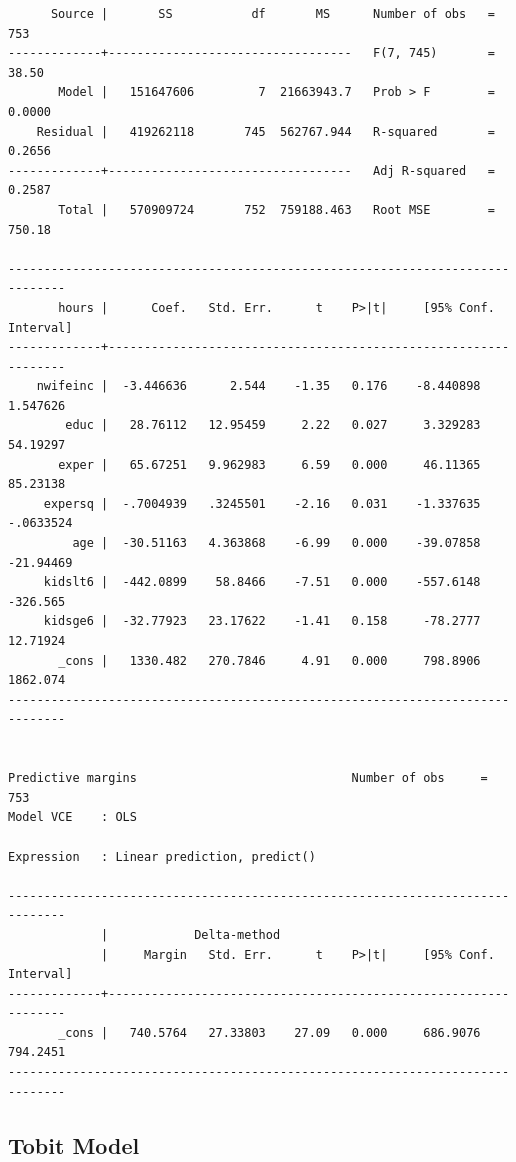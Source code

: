 \documentclass[
]{book}
\begin{document}
\begin{verbatim}
      Source |       SS           df       MS      Number of obs   =       753
-------------+----------------------------------   F(7, 745)       =     38.50
       Model |   151647606         7  21663943.7   Prob > F        =    0.0000
    Residual |   419262118       745  562767.944   R-squared       =    0.2656
-------------+----------------------------------   Adj R-squared   =    0.2587
       Total |   570909724       752  759188.463   Root MSE        =    750.18

------------------------------------------------------------------------------
       hours |      Coef.   Std. Err.      t    P>|t|     [95% Conf. Interval]
-------------+----------------------------------------------------------------
    nwifeinc |  -3.446636      2.544    -1.35   0.176    -8.440898    1.547626
        educ |   28.76112   12.95459     2.22   0.027     3.329283    54.19297
       exper |   65.67251   9.962983     6.59   0.000     46.11365    85.23138
     expersq |  -.7004939   .3245501    -2.16   0.031    -1.337635   -.0633524
         age |  -30.51163   4.363868    -6.99   0.000    -39.07858   -21.94469
     kidslt6 |  -442.0899    58.8466    -7.51   0.000    -557.6148    -326.565
     kidsge6 |  -32.77923   23.17622    -1.41   0.158     -78.2777    12.71924
       _cons |   1330.482   270.7846     4.91   0.000     798.8906    1862.074
------------------------------------------------------------------------------


Predictive margins                              Number of obs     =        753
Model VCE    : OLS

Expression   : Linear prediction, predict()

------------------------------------------------------------------------------
             |            Delta-method
             |     Margin   Std. Err.      t    P>|t|     [95% Conf. Interval]
-------------+----------------------------------------------------------------
       _cons |   740.5764   27.33803    27.09   0.000     686.9076    794.2451
------------------------------------------------------------------------------
\end{verbatim}

\subsection*{Tobit Model}\label{tobit-model}
\end{document}

